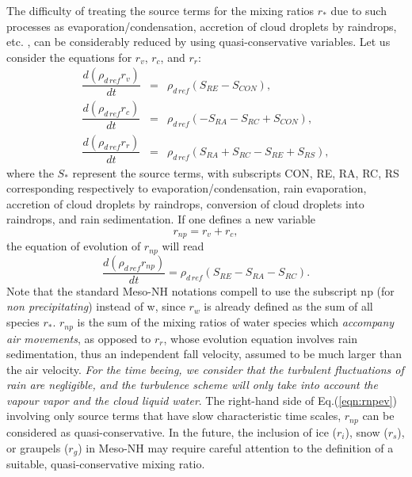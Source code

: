 The difficulty of treating the source terms for the mixing
ratios $r_*$ due to such processes as evaporation/condensation, accretion
of cloud droplets by raindrops, etc.  , can be considerably reduced by using
quasi-conservative variables.  Let us consider
the equations for $r_v$, $r_c$, and $r_r$:
\begin{eqnarray}
\dfrac{d(\rho_{d\,ref} r_v)}{dt}&=&\rho_{d\,ref}(S_{RE}-S_{CON}), \\
\dfrac{d(\rho_{d\,ref} r_c)}{dt}&=&\rho_{d\,ref}(-S_{RA}-S_{RC}+S_{CON}),\\
\dfrac{d(\rho_{d\,ref} r_r)}{dt}&=&\rho_{d\,ref}
 (S_{RA}+S_{RC}-S_{RE}+S_{RS}),
\end{eqnarray}
where the $S_*$ represent the source terms, with subscripts CON, RE, RA, RC, RS
corresponding respectively to evaporation/condensation, rain evaporation,
accretion of cloud droplets by raindrops, conversion of cloud droplets into
raindrops, and rain sedimentation.
If one defines a new variable
\begin{equation} \label{defrnp}
r_{np} = r_v+r_c,
\end{equation}
the equation of evolution of $r_{np}$ will read
\begin{equation}\label{eqn:rnpev}
\dfrac{d(\rho_{d\,ref} r_{np})}{dt} = \rho_{d\,ref} (S_{RE}-S_{RA}-S_{RC}).
\end{equation}
Note that the standard Meso-NH notations compell to use the subscript
np (for {\it non precipitating}) instead of w, since $r_w$ is already defined
as the sum of all species $r_*$.
$r_{np}$ is the sum of the mixing ratios of water species which {\it accompany
air movements}, as opposed to $r_r$, whose evolution equation involves rain
sedimentation, thus an independent fall velocity, assumed to be much larger
than the air velocity. {\it For the time beeing, we
consider that the turbulent fluctuations of rain are
negligible, and the turbulence scheme will only take into account
the vapour vapor and the cloud liquid water}.
The right-hand side of Eq.(\ref{eqn:rnpev}) involving only source terms that
have slow characteristic time scales, $r_{np}$ can be considered as
quasi-conservative.  In the future,
the inclusion of ice ($r_i$), snow ($r_s$), or graupels ($r_g$) in Meso-NH
may require careful
attention to the definition of a suitable, quasi-conservative mixing ratio.

